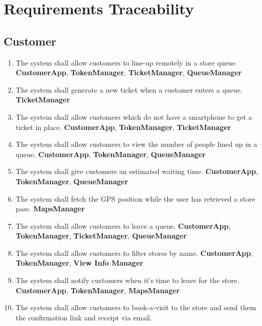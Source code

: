 \chapter{Requirements Traceability}
\section{Customer}
\begin{enumerate}[series=requirements, label=\textbf{R.\arabic*}]
	\item The system shall allow customers to line-up remotely in a store queue.
	\newline\textbf{CustomerApp}, \textbf{TokenManager}, \textbf{TicketManager}, \textbf{QueueManager}
	\item The system shall generate a new ticket when a customer enters a queue.
	\newline\textbf{TicketManager}
	\item The system shall allow customers which do not have a smartphone to get a ticket in place.
	\newline\textbf{CustomerApp}, \textbf{TokenManager}, \textbf{TicketManager}
	\item The system shall allow customers to view the number of people lined up in a queue.
	\newline\textbf{CustomerApp}, \textbf{TokenManager}, \textbf{QueueManager}
	\item The system shall give customers an estimated waiting time.
	\newline\textbf{CustomerApp}, \textbf{TokenManager}, \textbf{QueueManager}
	\item The system shall fetch the GPS position while the user has retrieved a store pass.
	\newline\textbf{MapsManager}
	\item The system shall allow customers to leave a queue.
	\newline\textbf{CustomerApp}, \textbf{TokenManager}, \textbf{TicketManager}, \textbf{QueueManager}
	\item The system shall allow customers to filter stores by name.
	\newline\textbf{CustomerApp}, \textbf{TokenManager}, \textbf{View Info Manager}
	\item The system shall notify customers when it's time to leave for the store.
	\newline\textbf{CustomerApp}, \textbf{TokenManager}, \textbf{MapsManager}
	\item The system shall allow customers to book-a-visit to the store and send them the confirmation link and receipt via email.

\end{enumerate}
